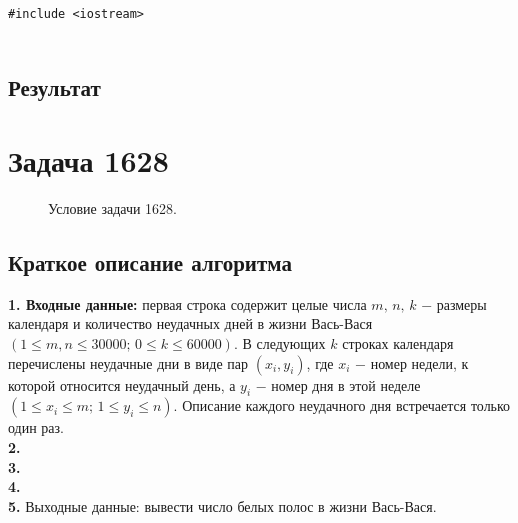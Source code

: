 \documentclass[a5paper, 10pt]{article}
\theoremstyle{definition}
\theoremstyle{plain}
\theoremstyle{remark}
\begin{document}
\begin{center}
\begin{lstlisting}[label=some-code,caption={Исходный код для 1521}]
#include <iostream>


\end{lstlisting}
\end{center}

\subsection{Результат}




\newpage
\section{Задача 1628}

\begin{figure}[h!]
\caption{Условие задачи 1628.}
\end{figure}

\subsection{Краткое описание алгоритма}
\textbf{1. Входные данные:} первая строка содержит целые числа $m, \, n, \, k$ $-$ размеры календаря и количество неудачных дней в жизни Вась-Вася $(1 \leq m, n \leq 30000; \, 0 \leq k \leq 60000)$. В следующих $k$ строках календаря перечислены неудачные дни в виде пар $(x_i, y_i)$, где $x_i$ $-$ номер недели, к которой относится неудачный день, а $y_i$ $-$ номер дня в этой неделе $(1 \leq x_i \leq m; \, 1 \leq y_i \leq n)$. Описание каждого неудачного дня встречается только один раз. \\
\textbf{2.}  \\
\textbf{3.}  \\
\textbf{4.}  \\
\textbf{5.} Выходные данные: вывести число белых полос в жизни Вась-Вася.
\end{document}
